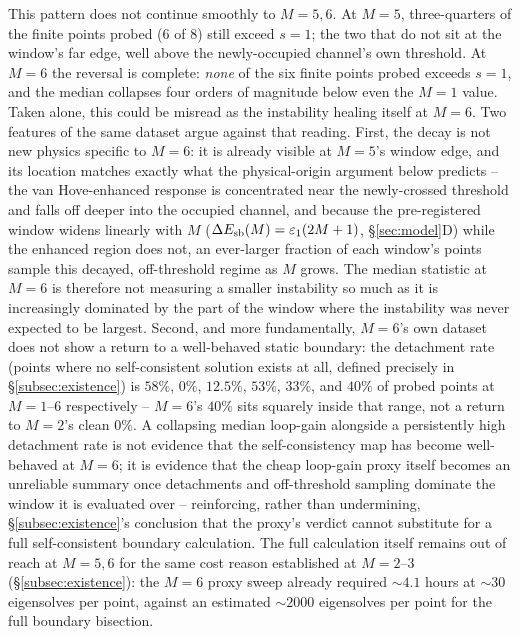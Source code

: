 \documentclass[aps,physrev,reprint,superscriptaddress,amsmath,amssymb,floatfix]{revtex4-2}
\begin{document}
This pattern does not continue smoothly to $M=5,6$. At $M=5$,
three-quarters of the finite points probed ($6$ of $8$) still exceed
$s=1$; the two that do not sit at the window's far edge, well above the
newly-occupied channel's own threshold. At $M=6$ the reversal is
complete: \emph{none} of the six finite points probed exceeds $s=1$, and
the median collapses four orders of magnitude below even the $M=1$
value. Taken alone, this could be misread as the instability healing
itself at $M=6$. Two features of the same dataset argue against that
reading. First, the decay is not new physics specific to $M=6$: it is
already visible at $M=5$'s window edge, and its location matches exactly
what the physical-origin argument below predicts -- the van
Hove-enhanced response is concentrated near the newly-crossed threshold
and falls off deeper into the occupied channel, and because the
pre-registered window widens linearly with $M$ ($\Delta E_{\rm
sb}(M)=\varepsilon_1(2M+1)$, \S\ref{sec:model}D) while the enhanced
region does not, an ever-larger fraction of each window's points sample
this decayed, off-threshold regime as $M$ grows. The median statistic at
$M=6$ is therefore not measuring a smaller instability so much as it is
increasingly dominated by the part of the window where the instability
was never expected to be largest. Second, and more fundamentally,
$M=6$'s own dataset does not show a return to a well-behaved static
boundary: the detachment rate (points where no self-consistent solution
exists at all, defined precisely in \S\ref{subsec:existence}) is $58\%$,
$0\%$, $12.5\%$, $53\%$, $33\%$, and $40\%$ of probed points at
$M=1$--$6$ respectively -- $M=6$'s $40\%$ sits squarely inside that
range, not a return to $M=2$'s clean $0\%$. A collapsing median loop-gain
alongside a persistently high detachment rate is not evidence that the
self-consistency map has become well-behaved at $M=6$; it is evidence
that the cheap loop-gain proxy itself becomes an unreliable summary once
detachments and off-threshold sampling dominate the window it is
evaluated over -- reinforcing, rather than undermining,
\S\ref{subsec:existence}'s conclusion that the proxy's verdict cannot
substitute for a full self-consistent boundary calculation. The full
calculation itself remains out of reach at $M=5,6$ for the same cost
reason established at $M=2$--$3$ (\S\ref{subsec:existence}): the $M=6$
proxy sweep already required $\sim4.1$ hours at $\sim30$ eigensolves per
point, against an estimated $\sim2000$ eigensolves per point for the
full boundary bisection.
\end{document}
